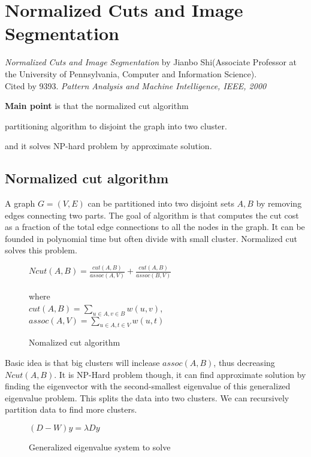 \section{Normalized Cuts and Image Segmentation}
\label{ch:jianbo00}

\textit{Normalized Cuts and Image Segmentation} by Jianbo Shi(Associate Professor at the University of Pennsylvania, Computer and Information Science). \\
Cited by 9393. \textit{Pattern Analysis and Machine Intelligence, IEEE, 2000}
\newline

\textbf{Main point} is that the normalized cut algorithm \begin{inparaenum}
\item partitioning algorithm to disjoint the graph into two cluster.
\item and it solves NP-hard problem by approximate solution.
\end{inparaenum}

\subsection{Normalized cut algorithm}
A graph $G = (V, E)$ can be partitioned into two disjoint sets $A, B$ by removing edges connecting two parts. The goal of algorithm is that computes the cut cost as a fraction of the total edge connections to all the nodes in the graph. It can be founded in polynomial time but often divide with small cluster. Normalized cut solves this problem.

\begin{figure}[ht]
\begin{mdframed}
$Ncut(A,B) = \frac{cut(A,B)}{assoc(A,V)} + \frac{cut(A,B)}{assoc(B,V)}$ \\
\\
where \\
$cut(A,B) = \sum_{u \in A, v \in B} w(u, v)$,\\
$assoc(A,V) = \sum_{u \in A, t \in V} w(u, t)$
\end{mdframed}
\caption{Nomalized cut algorithm}
\end{figure}

Basic idea is that big clusters will inclease $assoc(A,B)$, thus decreasing $Ncut(A,B)$. It is NP-Hard problem though, it can find approximate solution by finding the eigenvector with the second-smallest eigenvalue of this generalized eigenvalue problem. This splits the data into two clusters. We can recursively partition data to find more clusters.
\begin{figure}[ht]
\begin{mdframed}
$(D - W)y = \lambda D y$
\end{mdframed}
\caption{Generalized eigenvalue system to solve}
\end{figure}


